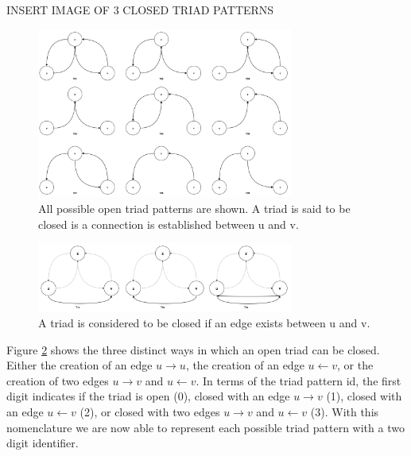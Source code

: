 INSERT IMAGE OF 3 CLOSED TRIAD PATTERNS 
\begin{figure}[H]
  \centering
  \includegraphics[width=0.75\textwidth]{images/thesis_triad_patterns.png}
  \caption[triad patterns]{All possible open triad patterns are shown. A triad is said to be closed is a connection is established between u and v.}
  \label{thesis_triad_patterns}
\end{figure}

\begin{figure}[H]
  \centering
  \includegraphics[width=0.75\textwidth]{images/thesis_closed_triads.png}
  \caption[closed triad patterns]{A triad is considered to be closed if an edge exists between u and v.}
  \label{thesis_closed_triads}
\end{figure}

Figure \ref{thesis_closed_triads} shows the three distinct ways in which an open triad can be closed. Either the creation of an edge $u \rightarrow u$, the creation of an edge $u \leftarrow v$, or the creation of two edges $u \rightarrow v$ and $u \leftarrow v$. In terms of the triad pattern id, the first digit indicates if the triad is open (0), closed with an edge $u \rightarrow v$ (1), closed with an edge $u \leftarrow v$ (2), or closed with two edges $u \rightarrow v$ and $u \leftarrow v$ (3). With this nomenclature we are now able to represent each possible triad pattern with a two digit identifier. 

